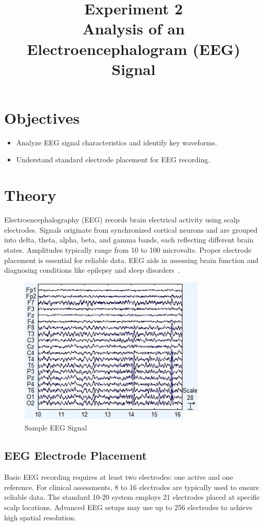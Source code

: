 \documentclass[11pt]{article}
\title{Experiment 2 \\
    \textbf{Analysis of an Electroencephalogram (EEG) Signal}}
\author{}
\date{}
\begin{document}


\pagebreak
\maketitle

\vspace{-6.5em}

\section*{Objectives}
\begin{itemize}
    \item Analyze EEG signal characteristics and identify key waveforms.
    \item Understand standard electrode placement for EEG recording.
\end{itemize}

\section*{Theory}
Electroencephalography (EEG) records brain electrical activity using scalp electrodes. Signals originate from synchronized cortical neurons and are grouped into delta, theta, alpha, beta, and gamma bands, each reflecting different brain states. Amplitudes typically range from 10 to 100 microvolts. Proper electrode placement is essential for reliable data. EEG aids in assessing brain function and diagnosing conditions like epilepsy and sleep disorders~\cite{siuly2016eeg}.

\begin{figure}[H]
    \centering
    \includegraphics[width=.43\textwidth]{eeg.jpg}
    \caption{Sample EEG Signal\cite{eeg}}
\end{figure}

\subsection*{EEG Electrode Placement}
Basic EEG recording requires at least two electrodes: one active and one reference. For clinical assessments, 8 to 16 electrodes are typically used to ensure reliable data. The standard 10-20 system employs 21 electrodes placed at specific scalp locations. Advanced EEG setups may use up to 256 electrodes to achieve high spatial resolution.
\end{document}
